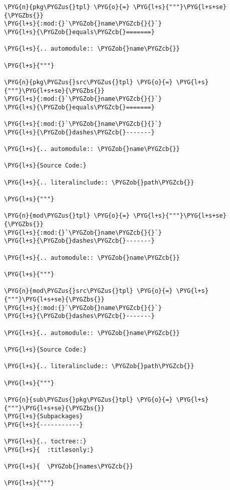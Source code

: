 \begin{Verbatim}[commandchars=\\\{\}]
\PYG{n}{pkg\PYGZus{}tpl} \PYG{o}{=} \PYG{l+s}{"""}\PYG{l+s+se}{\PYGZbs{}}
\PYG{l+s}{:mod:{}`\PYGZob{}name\PYGZcb{}{}`}
\PYG{l+s}{\PYGZob{}equals\PYGZcb{}=======}

\PYG{l+s}{.. automodule:: \PYGZob{}name\PYGZcb{}}

\PYG{l+s}{"""}

\PYG{n}{pkg\PYGZus{}src\PYGZus{}tpl} \PYG{o}{=} \PYG{l+s}{"""}\PYG{l+s+se}{\PYGZbs{}}
\PYG{l+s}{:mod:{}`\PYGZob{}name\PYGZcb{}{}`}
\PYG{l+s}{\PYGZob{}equals\PYGZcb{}=======}

\PYG{l+s}{:mod:{}`\PYGZob{}name\PYGZcb{}{}`}
\PYG{l+s}{\PYGZob{}dashes\PYGZcb{}-------}

\PYG{l+s}{.. automodule:: \PYGZob{}name\PYGZcb{}}

\PYG{l+s}{Source Code:}

\PYG{l+s}{.. literalinclude:: \PYGZob{}path\PYGZcb{}}

\PYG{l+s}{"""}

\PYG{n}{mod\PYGZus{}tpl} \PYG{o}{=} \PYG{l+s}{"""}\PYG{l+s+se}{\PYGZbs{}}
\PYG{l+s}{:mod:{}`\PYGZob{}name\PYGZcb{}{}`}
\PYG{l+s}{\PYGZob{}dashes\PYGZcb{}-------}

\PYG{l+s}{.. automodule:: \PYGZob{}name\PYGZcb{}}

\PYG{l+s}{"""}

\PYG{n}{mod\PYGZus{}src\PYGZus{}tpl} \PYG{o}{=} \PYG{l+s}{"""}\PYG{l+s+se}{\PYGZbs{}}
\PYG{l+s}{:mod:{}`\PYGZob{}name\PYGZcb{}{}`}
\PYG{l+s}{\PYGZob{}dashes\PYGZcb{}-------}

\PYG{l+s}{.. automodule:: \PYGZob{}name\PYGZcb{}}

\PYG{l+s}{Source Code:}

\PYG{l+s}{.. literalinclude:: \PYGZob{}path\PYGZcb{}}

\PYG{l+s}{"""}

\PYG{n}{sub\PYGZus{}pkg\PYGZus{}tpl} \PYG{o}{=} \PYG{l+s}{"""}\PYG{l+s+se}{\PYGZbs{}}
\PYG{l+s}{Subpackages}
\PYG{l+s}{-----------}

\PYG{l+s}{.. toctree::}
\PYG{l+s}{	:titlesonly:}

\PYG{l+s}{	\PYGZob{}names\PYGZcb{}}

\PYG{l+s}{"""}
\end{Verbatim}


